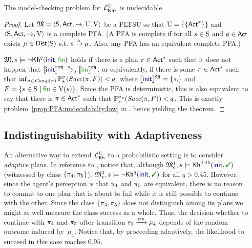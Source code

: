 \begin{theorem}\label{th:mc:PKhunc:undecidable}
  The model-checking problem for $\PKhunc$ is undecidable.
\end{theorem}
%
\begin{proof}
  Let $\model=\tup{\S,\Act,\ra,\Unc,\V}$ be a PLTSU so that
  $\Unc=\{\{\Act^*\}\}$ and $\tup{\S,\Act,\ra,\V}$ is a complete PFA.
  (A PFA is complete if for all $s\in\S$ and $a\in\Act$ exists
  $\mu\in\Dist(\S)$ s.t. $s\reach{a}\mu$.  Also, any PFA
  has an equivalent complete PFA.)

  $\model,s\models\neg\kh^q(\init,\fin)$ holds if there is a plan
  ${\plan\in \Act^*}$ such that it does not happen that
  ${\truthset{\model}{\init}\reach{\plan}_q\truthset{\model}{\fin}}$,
  or equivalently, if there is some $\plan\in \Act^*$  such that
  $\inf_{\strat\in\Comp(\plan)}\Prob^\strat_{\sini}(\Succ(\plan,F)) < q$,
  where $\truthset{\model}{\init}=\{\sini\}$ and
  $F=\{{s\in\S}\mid{\fin\in\V(s)}\}$.
  Since the PFA is deterministic, this is also equivalent to say that
  there is $\plan\in \Act^*$ such that
  $\Prob^{\strat_\plan}_{\sini}(\Succ(\plan,F)) < q$.
  This is exactly problem~\ref{prop:PFA:undecidabilty:low} in
  , hence yielding the theorem.
\end{proof}
  


\subsection{Indistinguishability with Adaptiveness}\label{subsec:prob:indist:adaptive}

An alternative way to extend $\Khunc$ to a probabilistic setting is to
consider \emph{adaptive} plans.
%
In reference to , notice that, although
$\modelex^1,s \models \kh^{0.45}(\init,\goal)$ (witnessed by class
$\{\plan_4,\plan_5\}$), $\modelex^1,s \models \neg\kh^q(\init,\goal)$
for all $q>0.45$.
%
However, since the agent's perception is that $\plan_4$ and $\plan_5$
are equivalent, there is no reason to commit to one plan that is about
to fail while it is still possible to continue with the other.  Since
the class $\{\plan_4,\plan_5\}$ does not distinguish among its plans
we might as well measure the class success as a whole.
%
Thus, the decision whether to continue with $\plan_4$ and $\plan_5$
after transition $s_0\reach{\ramp}\mu_4$ depends of the random outcome
induced by~$\mu_4$.  Notice that, by proceeding adaptively, the
likelihood to succeed in this case reaches $0.95$.

